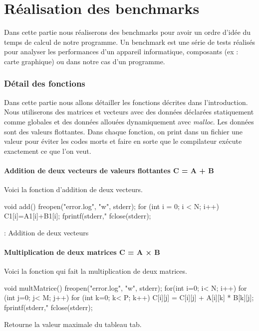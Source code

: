 \documentclass{rapport}
\begin{document}
  \clearpage
  \part{Réalisation des benchmarks}\setcounter{section}{0}
  
    Dans cette partie nous réaliserons des benchmarks pour avoir un ordre d'idée du temps de calcul de notre programme.
    Un benchmark est une série de tests réalisés pour analyser les performances d'un appareil informatique, composants (ex : carte graphique) ou dans notre cas d'un programme.
    
    \section{Détail des fonctions}
      Dans cette partie nous allons détailler les fonctions décrites dans l'introduction. Nous utiliserons des matrices et vecteurs avec des données déclarées statiquement comme globales et des données allouées dynamiquement avec \textit{malloc}. Les données sont des valeurs flottantes. Dans chaque fonction, on print dans un fichier une valeur pour éviter les codes morts et faire en sorte que le compilateur exécute exactement ce que l'on veut.
      \subsection{Addition de deux vecteurs de valeurs flottantes C = A + B}
        Voici la fonction d'addition de deux vecteurs.
        \begin{algorithm}
        \begin{C}
void add() {
	freopen("error.log", "w", stderr);
    for (int i = 0; i < N; i++) {
        C1[i]=A1[i]+B1[i];
        fprintf(stderr,"%
    }
    fclose(stderr);
}
        \end{C}
        \caption[Algo en C]{: Addition de deux vecteurs}
        \end{algorithm}
        
      \subsection{Multiplication de deux matrices C = A × B}
        Voici la fonction qui fait la multiplication de deux matrices.
        \begin{algorithm}
        \begin{C}
void multMatrice(){
    freopen("error.log", "w", stderr);
    for(int i=0; i< N; i++){
        for (int j=0; j< M; j++){
            for (int k=0; k< P; k++){
                C[i][j] = C[i][j] + A[i][k] * B[k][j];
            }
            fprintf(stderr,"%
        }
    }
    fclose(stderr);
}
        \end{C}
        \caption[Algo en C]{Retourne la valeur maximale du tableau tab.}
        \end{algorithm}
\end{document}
